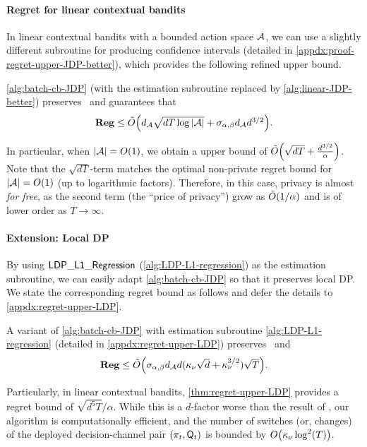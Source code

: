 \paragraph{Regret for linear contextual bandits}
In linear contextual bandits with a bounded action space $\mathcal{A}$, we can use a slightly different subroutine for producing confidence intervals (detailed in \cref{appdx:proof-regret-upper-JDP-better}), which provides the following refined upper bound.

\begin{theorem}\label{thm:regret-upper-JDP-better}
\cref{alg:batch-cb-JDP} (with the estimation subroutine replaced by \cref{alg:linear-JDP-better}) preserves \aJDP~and guarantees that
\begin{align*}
\textstyle
    \mathbf{Reg}\leq \tilde{O}{\left(  d_{\mathcal{A}} \sqrt{dT\log|\mathcal{A}|}+ \sigma_{\alpha,\beta} d_{\mathcal{A}} d^{3/2}  \right)}.
\end{align*}
\end{theorem}
\vspace{-10pt}
In particular, when $|\mathcal{A}|=O{\left( 1 \right)}$, we obtain a upper bound of $\tilde{O}{\left( \sqrt{dT}+\frac{d^{3/2}}{\alpha} \right)}$. Note that the $\sqrt{dT}$-term matches the optimal non-private regret bound for $|\mathcal{A}|=O{\left( 1 \right)}$ (up to logarithmic factors). %
Therefore, in this case, privacy is almost \emph{for free}, as the second term (the ``price of privacy'') grow as $\tilde{O}{\left( 1/\alpha \right)}$ and is of lower order as $T\to \infty$.

\paragraph{Extension: Local DP}
By using $\mathsf{LDP\_L1\_Regression}$ (\cref{alg:LDP-L1-regression}) as the estimation subroutine, we can easily adapt \cref{alg:batch-cb-JDP} so that it preserves local DP. We state the corresponding regret bound as follows and defer the details to \cref{appdx:regret-upper-LDP}.
\begin{theorem}\label{thm:regret-upper-LDP}
A variant of \cref{alg:batch-cb-JDP} with estimation subroutine \cref{alg:LDP-L1-regression} (detailed in \cref{appdx:regret-upper-LDP}) preserves \aLDP~and
\begin{align*}
\textstyle
    \mathbf{Reg}\leq \tilde{O}{\left( \sigma_{\alpha,\beta} d_{\mathcal{A}} d(\kappa_\nu\sqrt{d}+\kappa_\nu^{3/2}) \sqrt{T}  \right)}.
\end{align*}
\end{theorem}
\vspace{-10pt}
Particularly, in linear contextual bandits, \cref{thm:regret-upper-LDP} provides a regret bound of $\sqrt{d^5T}/\alpha$. While this is a $d$-factor worse than the result of \citet{chen2024private}, our algorithm is computationally efficient, and the number of switches (or, changes) of the deployed decision-channel pair $(\pi_t, \mathsf{Q}_t)$ is bounded by $O{\left( \kappa_\nu \log^2(T) \right)}$.

